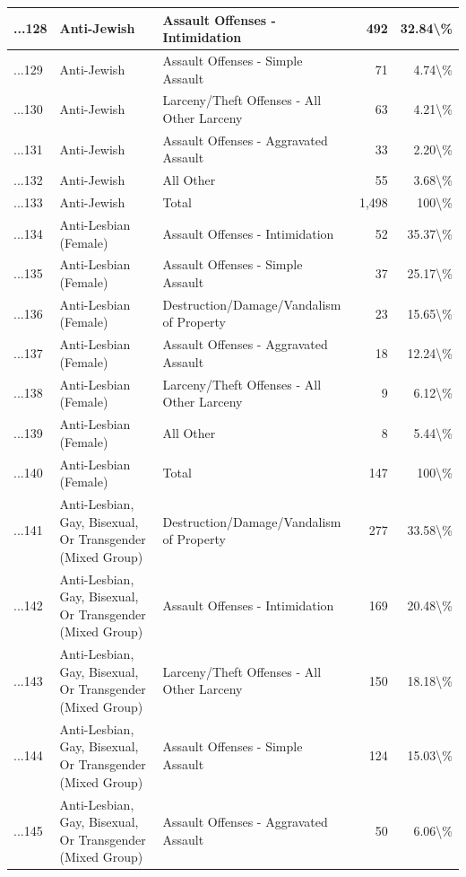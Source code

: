 \documentclass[
]{krantz}
\begin{document}
\begin{longtable}[t]{l|l|l|r|r}
\hline
...128 & Anti-Jewish & Assault Offenses - Intimidation & 492 & 32.84\textbackslash{}\%\\
\hline
...129 & Anti-Jewish & Assault Offenses - Simple Assault & 71 & 4.74\textbackslash{}\%\\
\hline
...130 & Anti-Jewish & Larceny/Theft Offenses - All Other Larceny & 63 & 4.21\textbackslash{}\%\\
\hline
...131 & Anti-Jewish & Assault Offenses - Aggravated Assault & 33 & 2.20\textbackslash{}\%\\
\hline
...132 & Anti-Jewish & All Other & 55 & 3.68\textbackslash{}\%\\
\hline
...133 & Anti-Jewish & Total & 1,498 & 100\textbackslash{}\%\\
\hline
...134 & Anti-Lesbian (Female) & Assault Offenses - Intimidation & 52 & 35.37\textbackslash{}\%\\
\hline
...135 & Anti-Lesbian (Female) & Assault Offenses - Simple Assault & 37 & 25.17\textbackslash{}\%\\
\hline
...136 & Anti-Lesbian (Female) & Destruction/Damage/Vandalism of Property & 23 & 15.65\textbackslash{}\%\\
\hline
...137 & Anti-Lesbian (Female) & Assault Offenses - Aggravated Assault & 18 & 12.24\textbackslash{}\%\\
\hline
...138 & Anti-Lesbian (Female) & Larceny/Theft Offenses - All Other Larceny & 9 & 6.12\textbackslash{}\%\\
\hline
...139 & Anti-Lesbian (Female) & All Other & 8 & 5.44\textbackslash{}\%\\
\hline
...140 & Anti-Lesbian (Female) & Total & 147 & 100\textbackslash{}\%\\
\hline
...141 & Anti-Lesbian, Gay, Bisexual, Or Transgender (Mixed Group) & Destruction/Damage/Vandalism of Property & 277 & 33.58\textbackslash{}\%\\
\hline
...142 & Anti-Lesbian, Gay, Bisexual, Or Transgender (Mixed Group) & Assault Offenses - Intimidation & 169 & 20.48\textbackslash{}\%\\
\hline
...143 & Anti-Lesbian, Gay, Bisexual, Or Transgender (Mixed Group) & Larceny/Theft Offenses - All Other Larceny & 150 & 18.18\textbackslash{}\%\\
\hline
...144 & Anti-Lesbian, Gay, Bisexual, Or Transgender (Mixed Group) & Assault Offenses - Simple Assault & 124 & 15.03\textbackslash{}\%\\
\hline
...145 & Anti-Lesbian, Gay, Bisexual, Or Transgender (Mixed Group) & Assault Offenses - Aggravated Assault & 50 & 6.06\textbackslash{}\%\\

\end{longtable}
\end{document}
